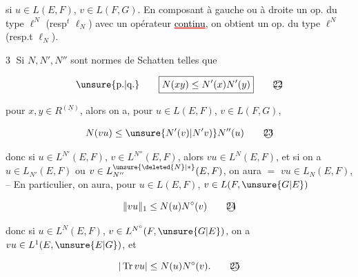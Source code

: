 si $u\in L(E,F)$, $v\in L(F,G)$.  En composant à gauche ou à droite un op.  du type $\ell^N$ (resp$^t$ $\ell_N$) avec un opérateur  \textcolor{red}{\uline{\textcolor{black}{continu}}}, on obtient un op. du type $\ell^N$ (resp.t $\ell_N$).

\textcircled{3}  Si $N,N',N''$ sont  normes de Schatten telles que

\[
\text{\unsure{p.|q.}}\qquad\boxed{N(xy)\leq N'(x)N'(y)}\tag*{\textcircled{22}}
\]

pour $x,y\in R^{(\underline N)}$, alors on a, pour $u\in L(E,F)$, $v\in L(F,G)$,

\[
N(vu)\leq \unsure{N'(v)|N'v)}N''(u)\tag*{\textcircled{23}}
\]

donc si $u\in L^{N'}(E,F)$, $v\in L^{N''}(E,F)$, alors $vu\in L^N(E,F)$, et si on a  $u\in L_{N'}(E,F)$ ou $v\in L_{N''}^{\unsure{\deleted{N}|*}}(E,F)$, on aura $=$ $vu\in L_N(E,F)$, -- En particulier, on aura, pour $u\in L(E,F)$, $v\in L(F,\unsure{G|E})$

\[
\lVert vu\rVert_1\leq N(u)N^\circ(v)\tag*{\textcircled{24}}
\]

donc si $u\in L^N(E,F)$, $v\in L^{N^\circ}(F,\unsure{G|E})$, on a $vu\in L^1(E,\unsure{E|G})$, et

\[
|\operatorname{Tr}vu|\leq N(u)N^\circ(v).\tag*{\textcircled{25}}
\]



